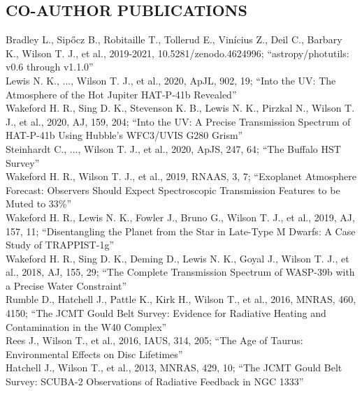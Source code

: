 \documentclass[letter, margin, 10pt]{res} %
\begin{document}
\begin{resume}
\section{CO-AUTHOR PUBLICATIONS}
Bradley L., Sip\H{o}cz B., Robitaille T., Tollerud E., Vinícius Z., Deil C., Barbary K., Wilson T. J., et al., 2019-2021, 10.5281/zenodo.4624996; ``astropy/photutils: v0.6 through v1.1.0''\vspace{2pt}\\
Lewis N. K., ..., Wilson T. J., et al., 2020, ApJL, 902, 19; ``Into the UV: The Atmosphere of the Hot Jupiter HAT-P-41b Revealed''\vspace{2pt}\\
Wakeford H. R., Sing D. K., Stevenson K. B., Lewis N. K., Pirzkal N., Wilson T. J., et al., 2020, AJ, 159, 204; ``Into the UV: A Precise Transmission Spectrum of HAT-P-41b Using Hubble's WFC3/UVIS G280 Grism''\vspace{2pt}\\
Steinhardt C., ..., Wilson T. J., et al., 2020, ApJS, 247, 64; ``The Buffalo HST Survey''\vspace{2pt}\\
Wakeford H. R., Wilson T. J., et al., 2019, RNAAS, 3, 7; ``Exoplanet Atmosphere Forecast: Observers Should Expect Spectroscopic Transmission Features to be Muted to 33\%''\vspace{2pt}\\
Wakeford H. R., Lewis N. K., Fowler J., Bruno G., Wilson T. J., et al., 2019, AJ, 157, 11; ``Disentangling the Planet from the Star in Late-Type M Dwarfs: A Case Study of TRAPPIST-1g''\vspace{2pt}\\
Wakeford H. R., Sing D. K., Deming D., Lewis N. K., Goyal J., Wilson T. J., et al., 2018, AJ, 155, 29; ``The Complete Transmission Spectrum of WASP-39b with a Precise Water Constraint''\vspace{2pt}\\
Rumble D., Hatchell J., Pattle K., Kirk H., Wilson T., et al., 2016, MNRAS, 460, 4150; ``The JCMT Gould Belt Survey: Evidence for Radiative Heating and Contamination in the W40 Complex''\vspace{2pt}\\
Rees J., Wilson T., et al., 2016, IAUS, 314, 205; ``The Age of Taurus: Environmental Effects on Disc Lifetimes''\vspace{2pt}\\
Hatchell J., Wilson T., et al., 2013, MNRAS, 429, 10; ``The JCMT Gould Belt Survey: SCUBA-2 Observations of Radiative Feedback in NGC 1333''


\end{resume}
\end{document}
